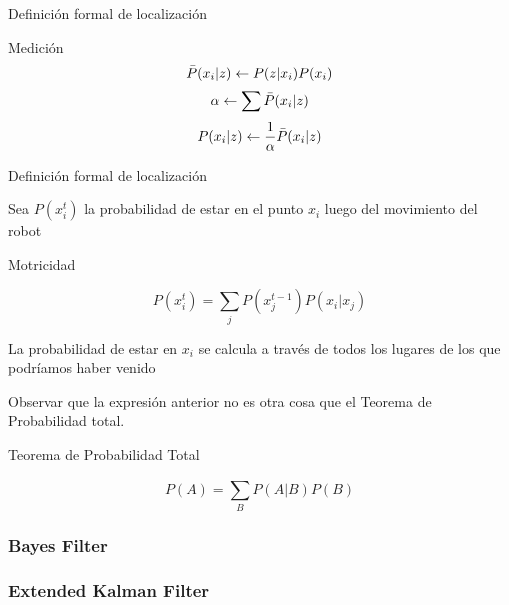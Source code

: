\begin{frame}{Definición formal de localización}
    
    \begin{block}{Medición}
        \begin{displaymath}
            \Bar{P}(x_{i}|z) \leftarrow P(z|x_{i}) P(x_{i})
        \end{displaymath}
        \begin{displaymath}
            \alpha \leftarrow \sum \Bar{P}(x_{i}|z)
        \end{displaymath}
        \begin{displaymath}
            P(x_{i}|z) \leftarrow \frac{1}{\alpha} \Bar{P}(x_{i}|z)
        \end{displaymath}
        
    \end{block}
    
\end{frame}

\begin{frame}{Definición formal de localización}
    
    Sea $P(x_{i}^{t})$ la probabilidad de estar en el punto $x_{i}$ luego del movimiento del robot
    
    \begin{block}{Motricidad}
        
        \begin{displaymath}
            P(x_{i}^{t}) = \sum_{j} P(x_{j}^{t-1}) P(x_{i}|x_{j})
        \end{displaymath}
        
    \end{block}
    
    La probabilidad de estar en $x_{i}$ se calcula a través de todos los lugares de los que podríamos haber venido
    
    Observar que la expresión anterior no es otra cosa que el Teorema de Probabilidad total.
    
    \begin{block}{Teorema de Probabilidad Total}
        
        \begin{displaymath}
            P(A) = \sum_{B}^{}P(A|B) P(B)
        \end{displaymath}
        
    \end{block}
    
\end{frame}


\begin{frame}
	\frametitle{Bayes Filter}
	
	
	
\end{frame}

\begin{frame}
	\frametitle{Extended Kalman Filter}
	
\end{frame}

